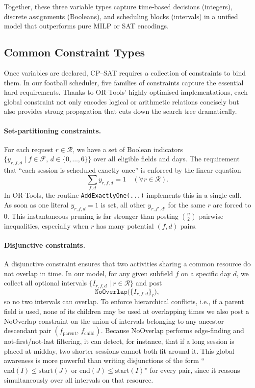 \documentclass[12pt]{article}
\begin{document}
Together, these three variable types capture time‐based decisions (integers), discrete assignments (Booleans), and scheduling blocks (intervals) in a unified model that outperforms pure MILP or SAT encodings.


\subsection{Common Constraint Types}

Once variables are declared, CP–SAT requires a collection of constraints to bind them. In our football scheduler, five families of constraints capture the essential hard requirements. Thanks to OR-Tools’ highly optimised implementations, each global constraint not only encodes logical or arithmetic relations concisely but also provides strong propagation that cuts down the search tree dramatically.

\paragraph{Set-partitioning constraints.}
For each request \(r\in\mathcal{R}\), we have a set of Boolean indicators \(\{y_{r,f,d}\mid f\in\mathcal{F},\,d\in\{0,\dots,6\}\}\) over all eligible fields and days. The requirement that “each session is scheduled exactly once” is enforced by the linear equation
\[
  \sum_{f,d} y_{r,f,d} = 1
  \quad(\forall r\in\mathcal{R}).
\]
In OR-Tools, the routine \texttt{AddExactlyOne(...)} implements this in a single call. As soon as one literal \(y_{r,f,d}=1\) is set, all other \(y_{r,f',d'}\) for the same \(r\) are forced to 0. This instantaneous pruning is far stronger than posting \(\binom{n}{2}\) pairwise inequalities, especially when \(r\) has many potential \((f,d)\) pairs.

\paragraph{Disjunctive constraints.}
A disjunctive constraint ensures that two activities sharing a common resource do not overlap in time. In our model, for any given subfield \(f\) on a specific day \(d\), we collect all optional intervals \(\{I_{r,f,d}\mid r\in\mathcal{R}\}\) and post
\[
  \texttt{NoOverlap}\bigl(\{I_{r,f,d}\}_{r}\bigr),
\]
so no two intervals can overlap. To enforce hierarchical conflicts, i.e., if a parent field is used, none of its children may be used at overlapping times we also post a NoOverlap constraint on the union of intervals belonging to any ancestor–descendant pair \((f_{\text{parent}},\,f_{\text{child}})\). Because NoOverlap performs edge-finding and not-first/not-last filtering, it can detect, for instance, that if a long session is placed at midday, two shorter sessions cannot both fit around it. This global awareness is more powerful than writing disjunctions of the form “\(\text{end}(I)\le\text{start}(J)\) or \(\text{end}(J)\le\text{start}(I)\)” for every pair, since it reasons simultaneously over all intervals on that resource.
\end{document}

